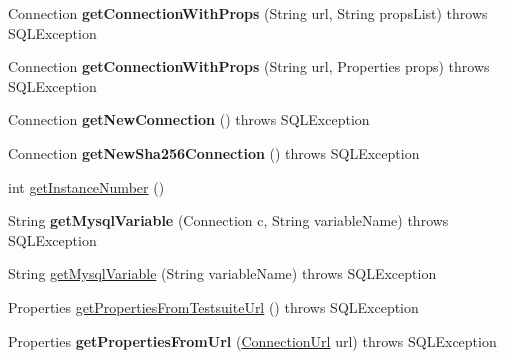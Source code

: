 \begin{DoxyCompactItemize}
\mbox{\label{classtestsuite_1_1_base_test_case_a6d4d784759272e95598bed255fe533fa}} 
Connection {\bfseries get\+Connection\+With\+Props} (String url, String props\+List)  throws S\+Q\+L\+Exception 
\item 
\mbox{\label{classtestsuite_1_1_base_test_case_a63736613e1c2617aa290baa6ecadaf1b}} 
Connection {\bfseries get\+Connection\+With\+Props} (String url, Properties props)  throws S\+Q\+L\+Exception 
\item 
\mbox{\label{classtestsuite_1_1_base_test_case_af4fbedf355c4e4adc888e5acb709694f}} 
Connection {\bfseries get\+New\+Connection} ()  throws S\+Q\+L\+Exception 
\item 
\mbox{\label{classtestsuite_1_1_base_test_case_af0bcfb0a02343c87cca38ff29fae2f4d}} 
Connection {\bfseries get\+New\+Sha256\+Connection} ()  throws S\+Q\+L\+Exception 
\item 
int \mbox{\hyperlink{classtestsuite_1_1_base_test_case_a06bbcacd72ff13e3905c04aada69feea}{get\+Instance\+Number}} ()
\item 
\mbox{\label{classtestsuite_1_1_base_test_case_a234990bc9494798d81b98dd40e7fe4eb}} 
String {\bfseries get\+Mysql\+Variable} (Connection c, String variable\+Name)  throws S\+Q\+L\+Exception 
\item 
String \mbox{\hyperlink{classtestsuite_1_1_base_test_case_ac50ae23586e12eaab184308368a6fb1d}{get\+Mysql\+Variable}} (String variable\+Name)  throws S\+Q\+L\+Exception 
\item 
Properties \mbox{\hyperlink{classtestsuite_1_1_base_test_case_ab63fc653810c4915e190196e7b3d6e6c}{get\+Properties\+From\+Testsuite\+Url}} ()  throws S\+Q\+L\+Exception 
\item 
\mbox{\label{classtestsuite_1_1_base_test_case_aec421614a4dc2ce6816ebb64a25db62b}} 
Properties {\bfseries get\+Properties\+From\+Url} (\mbox{\hyperlink{classcom_1_1mysql_1_1cj_1_1conf_1_1_connection_url}{Connection\+Url}} url)  throws S\+Q\+L\+Exception 
\item 
\mbox{\label{classtestsuite_1_1_base_test_case_a5a75db77f31d0984a0d1331dc49cadc0}} 

\end{DoxyCompactItemize}
